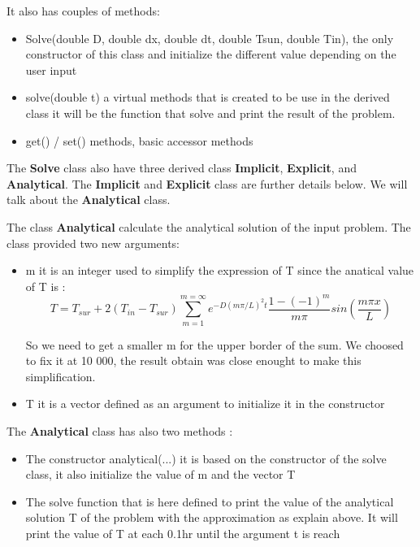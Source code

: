 \documentclass [10 pt, a4 paper]{article}
\begin{document}
\vspace{0.3cm}
It also has couples of methods:
\begin{itemize}
    \item Solve(double D, double dx, double dt, double Tsun, double Tin), the only constructor of 
    this class and initialize the different value depending on the user input
    \item solve(double t) a virtual methods that is created to be use in the derived class it will be the function
    that solve and print the result of the problem.
    \item get() / set() methods, basic accessor methods   
\end{itemize}

\vspace{0.3cm}
The \textbf{Solve} class also have three derived class \textbf{Implicit}, \textbf{Explicit}, and \textbf{Analytical}.
The \textbf{Implicit} and \textbf{Explicit} class are further details below. We will talk about the \textbf{Analytical} class.
\vspace{0.3cm}

The class \textbf{Analytical} calculate the analytical solution of the input problem.
The class provided two new arguments:
\begin{itemize}
    \item m it is an integer used to simplify the expression of T since the anatical value of T is : 
    \begin{equation}
        T = T_{sur} + 2(T_{in}-T_{sur}) \sum_{m=1}^{m=\infty} e^{-D(m\pi /L)^{2}t} \frac{1-(-1)^{m}}{m\pi} sin(\frac{m\pi x}{L})
    \end{equation}

    So we need to get a smaller m for the upper border of the sum. We choosed to fix it at 10 000, 
    the result obtain was close enought to make this simplification.

    \item T it is a vector defined as an argument to initialize it in the constructor
\end{itemize}
The \textbf{Analytical} class has also two methods :
\begin{itemize}
    \item The constructor analytical(...) it is based on the constructor of the solve class, it also
    initialize the value of m and the vector T
    \item The solve function that is here defined to print the value of the analytical solution T 
    of the problem with the approximation as explain above. It will print the value of T at each 0.1hr
    until the argument t is reach
\end{itemize}
\end{document}
